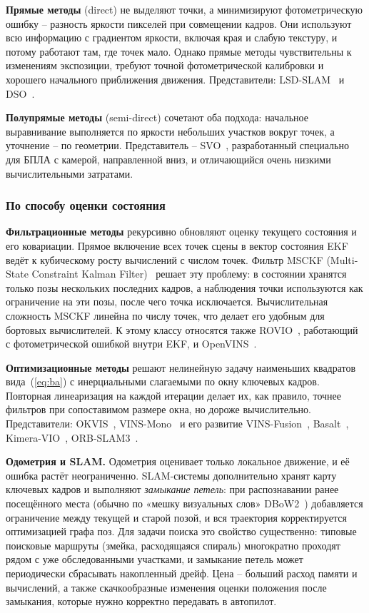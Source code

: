     \textbf{Прямые методы} (direct) не выделяют точки, а минимизируют фотометрическую ошибку -- разность яркости пикселей при совмещении кадров.
    Они используют всю информацию с градиентом яркости, включая края и слабую текстуру, и потому работают там, где точек мало.
    Однако прямые методы чувствительны к изменениям экспозиции, требуют точной фотометрической калибровки и хорошего начального приближения движения.
    Представители: LSD-SLAM~\cite{lsd_slam} и DSO~\cite{dso}.

    \textbf{Полупрямые методы} (semi-direct) сочетают оба подхода: начальное выравнивание выполняется по яркости небольших участков вокруг точек, а уточнение -- по геометрии.
    Представитель -- SVO~\cite{svo, svo2}, разработанный специально для БПЛА с камерой, направленной вниз, и отличающийся очень низкими вычислительными затратами.

    \subsubsection{По способу оценки состояния}

    \textbf{Фильтрационные методы} рекурсивно обновляют оценку текущего состояния и его ковариации.
    Прямое включение всех точек сцены в вектор состояния EKF ведёт к кубическому росту вычислений с числом точек.
    Фильтр MSCKF (Multi-State Constraint Kalman Filter)~\cite{msckf} решает эту проблему: в состоянии хранятся только позы нескольких последних кадров, а наблюдения точки используются как ограничение на эти позы, после чего точка исключается.
    Вычислительная сложность MSCKF линейна по числу точек, что делает его удобным для бортовых вычислителей.
    К этому классу относятся также ROVIO~\cite{rovio}, работающий с фотометрической ошибкой внутри EKF, и OpenVINS~\cite{openvins}.

    \textbf{Оптимизационные методы} решают нелинейную задачу наименьших квадратов вида~(\ref{eq:ba}) с инерциальными слагаемыми по окну ключевых кадров.
    Повторная линеаризация на каждой итерации делает их, как правило, точнее фильтров при сопоставимом размере окна, но дороже вычислительно.
    Представители: OKVIS~\cite{okvis}, VINS-Mono~\cite{vins_mono} и его развитие VINS-Fusion~\cite{vins_fusion}, Basalt~\cite{basalt}, Kimera-VIO~\cite{kimera}, ORB-SLAM3~\cite{orbslam3}.

    \textbf{Одометрия и SLAM.}
    Одометрия оценивает только локальное движение, и её ошибка растёт неограниченно.
    SLAM-системы дополнительно хранят карту ключевых кадров и выполняют \emph{замыкание петель}: при распознавании ранее посещённого места (обычно по «мешку визуальных слов» DBoW2~\cite{dbow2}) добавляется ограничение между текущей и старой позой, и вся траектория корректируется оптимизацией графа поз.
    Для задачи поиска это свойство существенно: типовые поисковые маршруты (змейка, расходящаяся спираль) многократно проходят рядом с уже обследованными участками, и замыкание петель может периодически сбрасывать накопленный дрейф.
    Цена -- больший расход памяти и вычислений, а также скачкообразные изменения оценки положения после замыкания, которые нужно корректно передавать в автопилот.

